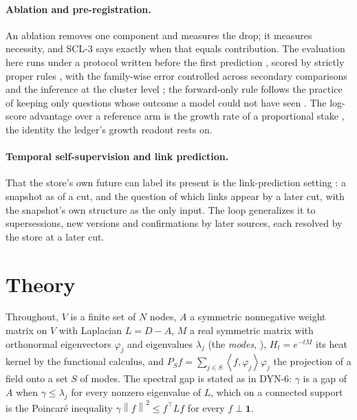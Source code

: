 \documentclass[11pt,a4paper]{article}
\theoremstyle{plain}
\theoremstyle{definition}
\theoremstyle{remark}
\newcommand{\norm}[1]{\left\lVert #1 \right\rVert}
\newcommand{\ip}[2]{\left\langle #1, #2 \right\rangle}
\newcommand{\lean}[1]{\path{#1}}
\begin{document}
\paragraph{Ablation and pre-registration.}
An ablation removes one component and measures the drop; it measures necessity, and SCL-3 says
exactly when that equals contribution. The evaluation here runs under a protocol written before
the first prediction \cite{nosek2018preregistration}, scored by strictly proper rules
\cite{brier1950verification,gneiting2007strictly}, with the family-wise error controlled across
secondary comparisons \cite{holm1979simple} and the inference at the cluster level
\cite{cameron2008bootstrap}; the forward-only rule follows the practice of keeping only questions
whose outcome a model could not have seen \cite{halawi2024approaching}. The log-score advantage over
a reference arm is the growth rate of a proportional stake \cite{kelly1956}, the identity the
ledger's growth readout rests on.

\paragraph{Temporal self-supervision and link prediction.}
That the store's own future can label its present is the link-prediction setting
\cite{libennowell2007link}: a snapshot as of a cut, and the question of which links appear by a
later cut, with the snapshot's own structure as the only input. The loop generalizes it to
supersessions, new versions and confirmations by later sources, each resolved by the store at a
later cut.

\section{Theory}

Throughout, $V$ is a finite set of $N$ nodes, $A$ a symmetric nonnegative weight matrix on $V$
with Laplacian $L = D - A$, $M$ a real symmetric matrix with orthonormal eigenvectors $\varphi_j$
and eigenvalues $\lambda_j$ (the \emph{modes}, \lean{Palace.Dynamics.mode}), $H_t = e^{-tM}$ its
heat kernel by the functional calculus, and $P_S f = \sum_{j \in S}\ip{f}{\varphi_j}\varphi_j$ the
projection of a field onto a set $S$ of modes. The spectral gap is stated as in DYN-6: $\gamma$ is a
gap of $A$ when $\gamma \le \lambda_j$ for every nonzero eigenvalue of $L$, which on a connected
support is the Poincar\'e inequality $\gamma\norm{f}^2 \le f^{\top}Lf$ for every $f \perp \mathbf{1}$.
\end{document}
